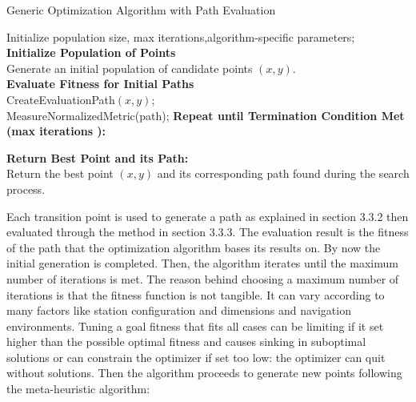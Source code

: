 \begin{algorithm}[H]
    \caption{Generic Optimization Algorithm with Path Evaluation}\label{optimization}
    
    
    Initialize  
    population size, max iterations,algorithm-specific parameters;\\
    \textbf{Initialize Population of Points}\\
    Generate an initial population of candidate points $(x, y)$.\\

    \textbf{Evaluate Fitness for Initial Paths}\\
    CreateEvaluationPath$(x, y)$;\\
    MeasureNormalizedMetric(path);    
    \textbf{Repeat until Termination Condition Met (max iterations ):}\\
    
    \textbf{Return Best Point and its Path:}\\
    Return the best point $(x, y)$ and its corresponding path found during the search process.
    \end{algorithm}



Each transition point is used to generate a path as explained
in section 3.3.2 then evaluated through the method in section 3.3.3. The evaluation result is the fitness of the path that the 
optimization algorithm bases its results on. By now the initial generation is completed. Then, the algorithm iterates until 
the maximum number of iterations is met. The reason behind choosing a maximum number of iterations is that the fitness function 
is not tangible. It can vary according to many factors like station configuration and dimensions and navigation environments.
Tuning a goal fitness that fits all cases can be limiting if it set higher than the possible optimal fitness and causes sinking in 
suboptimal solutions or can constrain the optimizer if set too low: the optimizer can quit without solutions.
Then the algorithm proceeds to generate new points following the meta-heuristic algorithm:

